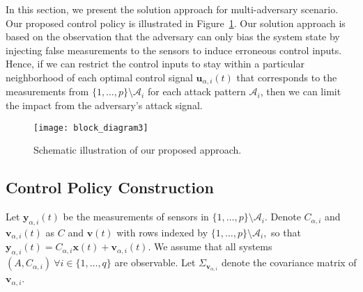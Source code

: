 \documentclass[journal]{IEEEtran}
\begin{document}
In this section, we present the solution approach for multi-adversary scenario. Our proposed control policy is illustrated in Figure~\ref{fig:block_diagram}. Our solution approach is based on the observation that the adversary can only bias the system state by injecting false measurements to the sensors to induce erroneous control inputs. Hence, if we can restrict the control inputs to stay within a particular neighborhood of each optimal control signal $\mathbf{u}_{\alpha,i}(t)$ that corresponds to the measurements from $\{1,\ldots,p\}\setminus \mathcal{A}_i$ for each attack pattern $\mathcal{A}_i$, then we can limit the impact from the adversary’s attack signal.

\begin{figure}[!ht]
\centering
\texttt{[image: block\_diagram3]}
\caption{Schematic illustration of our proposed approach.} 
\label{fig:block_diagram}
\end{figure}

\subsection{Control Policy Construction}
\label{subsec:control-policy}
 
Let $\mathbf{y}_{\alpha,i}(t)$ be the measurements of sensors in $\{1,\ldots,p\} \setminus \mathcal{A}_i$. Denote $C_{\alpha, i}$ and $\mathbf{v}_{\alpha, i}(t)$ as $C$ and $\mathbf{v}(t)$ with rows indexed by $\{1,\ldots,p\} \setminus \mathcal{A}_i,$ so that $\mathbf{y}_{\alpha, i}(t) = C_{\alpha, i}\mathbf{x}(t) + \mathbf{v}_{\alpha, i}(t)$. We assume that all systems $(A, C_{\alpha, i}) \ \forall i \in \{1,\ldots,q\}$ are observable. Let $\Sigma_{\mathbf{v}_{\alpha, i}}$ denote the covariance matrix of $\mathbf{v}_{\alpha, i}$. 
\end{document}
